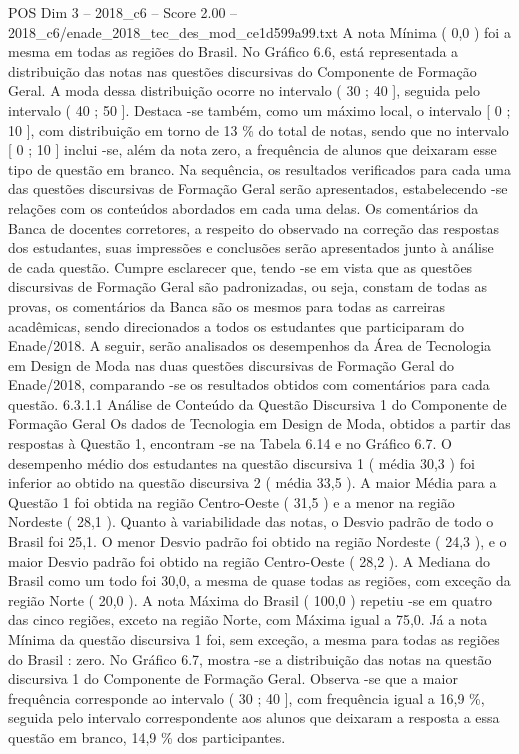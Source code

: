 \begin{textsample}{POS Dim 3 – 2018\_c6 – Score 2.00 – 2018\_c6/enade\_2018\_tec\_des\_mod\_ce1d599a99.txt}
A nota Mínima ( 0,0 ) foi a mesma em todas as regiões do Brasil.
No Gráfico 6.6, está representada a distribuição das notas nas questões discursivas do Componente de Formação Geral.
A moda dessa distribuição ocorre no intervalo ( 30 ; 40 ], seguida pelo intervalo ( 40 ; 50 ].
Destaca -se também, como um máximo local, o intervalo [ 0 ; 10 ], com distribuição em torno de 13 \% do total de notas, sendo que no intervalo [ 0 ; 10 ] inclui -se, além da nota zero, a frequência de alunos que deixaram esse tipo de questão em branco.
Na sequência, os resultados verificados para cada uma das questões discursivas de Formação Geral serão apresentados, estabelecendo -se relações com os conteúdos abordados em cada uma delas.
Os comentários da Banca de docentes corretores, a respeito do observado na correção das respostas dos estudantes, suas impressões e conclusões serão apresentados junto à análise de cada questão.
Cumpre esclarecer que, tendo -se em vista que as questões discursivas de Formação Geral são padronizadas, ou seja, constam de todas as provas, os comentários da Banca são os mesmos para todas as carreiras acadêmicas, sendo direcionados a todos os estudantes que participaram do Enade/2018.
A seguir, serão analisados os desempenhos da Área de Tecnologia em Design de Moda nas duas questões discursivas de Formação Geral do Enade/2018, comparando -se os resultados obtidos com comentários para cada questão. 6.3.1.1 Análise de Conteúdo da Questão Discursiva 1 do Componente de Formação Geral Os dados de Tecnologia em Design de Moda, obtidos a partir das respostas à Questão 1, encontram -se na Tabela 6.14 e no Gráfico 6.7.
O desempenho médio dos estudantes na questão discursiva 1 ( média 30,3 ) foi inferior ao obtido na questão discursiva 2 ( média 33,5 ).
A maior Média para a Questão 1 foi obtida na região Centro-Oeste ( 31,5 ) e a menor na região Nordeste ( 28,1 ).
Quanto à variabilidade das notas, o Desvio padrão de todo o Brasil foi 25,1.
O menor Desvio padrão foi obtido na região Nordeste ( 24,3 ), e o maior Desvio padrão foi obtido na região Centro-Oeste ( 28,2 ).
A Mediana do Brasil como um todo foi 30,0, a mesma de quase todas as regiões, com exceção da região Norte ( 20,0 ).
A nota Máxima do Brasil ( 100,0 ) repetiu -se em quatro das cinco regiões, exceto na região Norte, com Máxima igual a 75,0.
Já a nota Mínima da questão discursiva 1 foi, sem exceção, a mesma para todas as regiões do Brasil : zero.
No Gráfico 6.7, mostra -se a distribuição das notas na questão discursiva 1 do Componente de Formação Geral.
Observa -se que a maior frequência corresponde ao intervalo ( 30 ; 40 ], com frequência igual a 16,9 \%, seguida pelo intervalo correspondente aos alunos que deixaram a resposta a essa questão em branco, 14,9 \% dos participantes.

\end{textsample}
